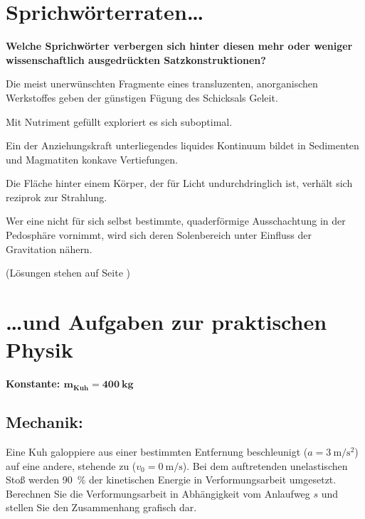\section[Sprichwörterraten und Aufgaben zur praktischen Physik]{Sprichwörterraten\dots}
\vspace{-0.7cm}
\textbf{Welche Sprichwörter verbergen sich hinter diesen mehr oder weniger wissenschaftlich ausgedrückten Satzkonstruktionen?}

{\footnotesize
Die meist unerwünschten Fragmente eines transluzenten, anorganischen Werkstoffes geben der günstigen Fügung des Schicksals Geleit.

Mit Nutriment gefüllt exploriert es sich suboptimal.

Ein der Anziehungskraft unterliegendes liquides Kontinuum bildet in Sedimenten und Magmatiten konkave Vertiefungen.

Die Fläche hinter einem Körper, der für Licht undurchdringlich ist, verhält sich reziprok zur Strahlung.

Wer eine nicht für sich selbst bestimmte, quaderförmige Ausschachtung in der Pedosphäre vornimmt, wird sich deren Solenbereich unter Einfluss der Gravitation nähern.

(Lösungen stehen auf Seite \pageref{rätsel_lösungen})\par}
\vspace{-0.7cm}

\vspace{-0.7cm}
\section*{{\dots}und Aufgaben zur praktischen Physik}
\vspace{-0.6cm}
\textbf{Konstante: $\mathbf{m_\text{Kuh} = \SI[detect-weight]{400}{\kg}}$}

\vspace{-0.2cm}
\subsection*{Mechanik:}
\vspace{-0.1cm}
Eine Kuh galoppiere aus einer bestimmten Entfernung beschleunigt ($a = \SI{3}{\m\per\s\squared}$) auf eine andere, stehende zu ($v_0 = \SI{0}{\m\per\s}$). Bei dem auftretenden unelastischen Stoß werden \SI{90}{\percent} der kinetischen Energie in Verformungsarbeit umgesetzt. Berechnen Sie die Verformungsarbeit in Abhängigkeit vom Anlaufweg $s$ und stellen Sie den Zusammenhang grafisch dar.

